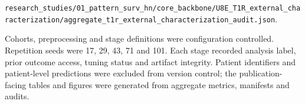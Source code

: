 \documentclass[pdflatex,sn-nature]{sn-jnl}
\begin{document}
{\footnotesize\texttt{r\allowbreak{}e\allowbreak{}s\allowbreak{}e\allowbreak{}a\allowbreak{}r\allowbreak{}c\allowbreak{}h\allowbreak{}\_\allowbreak{}s\allowbreak{}t\allowbreak{}u\allowbreak{}d\allowbreak{}i\allowbreak{}e\allowbreak{}s\allowbreak{}/\allowbreak{}0\allowbreak{}1\allowbreak{}\_\allowbreak{}p\allowbreak{}a\allowbreak{}t\allowbreak{}t\allowbreak{}e\allowbreak{}r\allowbreak{}n\allowbreak{}\_\allowbreak{}s\allowbreak{}u\allowbreak{}r\allowbreak{}v\allowbreak{}\_\allowbreak{}h\allowbreak{}n\allowbreak{}/\allowbreak{}c\allowbreak{}o\allowbreak{}r\allowbreak{}e\allowbreak{}\_\allowbreak{}b\allowbreak{}a\allowbreak{}c\allowbreak{}k\allowbreak{}b\allowbreak{}o\allowbreak{}n\allowbreak{}e\allowbreak{}/\allowbreak{}U\allowbreak{}8\allowbreak{}E\allowbreak{}\_\allowbreak{}T\allowbreak{}1\allowbreak{}R\allowbreak{}\_\allowbreak{}e\allowbreak{}x\allowbreak{}t\allowbreak{}e\allowbreak{}r\allowbreak{}n\allowbreak{}a\allowbreak{}l\allowbreak{}\_\allowbreak{}c\allowbreak{}h\allowbreak{}a\allowbreak{}r\allowbreak{}a\allowbreak{}c\allowbreak{}t\allowbreak{}e\allowbreak{}r\allowbreak{}i\allowbreak{}z\allowbreak{}a\allowbreak{}t\allowbreak{}i\allowbreak{}o\allowbreak{}n\allowbreak{}/\allowbreak{}a\allowbreak{}g\allowbreak{}g\allowbreak{}r\allowbreak{}e\allowbreak{}g\allowbreak{}a\allowbreak{}t\allowbreak{}e\allowbreak{}\_\allowbreak{}t\allowbreak{}1\allowbreak{}r\allowbreak{}\_\allowbreak{}e\allowbreak{}x\allowbreak{}t\allowbreak{}e\allowbreak{}r\allowbreak{}n\allowbreak{}a\allowbreak{}l\allowbreak{}\_\allowbreak{}c\allowbreak{}h\allowbreak{}a\allowbreak{}r\allowbreak{}a\allowbreak{}c\allowbreak{}t\allowbreak{}e\allowbreak{}r\allowbreak{}i\allowbreak{}z\allowbreak{}a\allowbreak{}t\allowbreak{}i\allowbreak{}o\allowbreak{}n\allowbreak{}\_\allowbreak{}a\allowbreak{}u\allowbreak{}d\allowbreak{}i\allowbreak{}t\allowbreak{}.\allowbreak{}j\allowbreak{}s\allowbreak{}o\allowbreak{}n}}.

Cohorts, preprocessing and stage definitions were configuration controlled. Repetition seeds were 17, 29, 43, 71 and 101. Each stage recorded analysis label, prior outcome access, tuning status and artifact integrity. Patient identifiers and patient-level predictions were excluded from version control; the publication-facing tables and figures were generated from aggregate metrics, manifests and audits.
\end{document}
